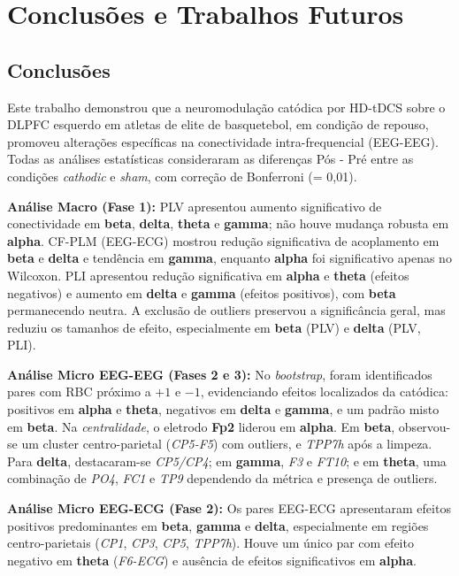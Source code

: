 \chapter{Conclusões e Trabalhos Futuros}
\label{chap:conclusoes_e_trabalhos_futuros}

\section{Conclusões}
Este trabalho demonstrou que a neuromodulação catódica por HD-tDCS sobre o DLPFC esquerdo em atletas de elite de basquetebol, em condição de repouso, promoveu alterações específicas na conectividade intra-frequencial (EEG-EEG). Todas as análises estatísticas consideraram as diferenças Pós - Pré entre as condições \emph{cathodic} e \textit{sham}, com correção de Bonferroni (\alpha= 0,01).

\noindent\textbf{Análise Macro (Fase 1):} PLV apresentou aumento significativo de conectividade em \textbf{beta}, \textbf{delta}, \textbf{theta} e \textbf{gamma}; não houve mudança robusta em \textbf{alpha}. CF-PLM (EEG-ECG) mostrou redução significativa de acoplamento em \textbf{beta} e \textbf{delta} e tendência em \textbf{gamma}, enquanto \textbf{alpha} foi significativo apenas no Wilcoxon. PLI apresentou redução significativa em \textbf{alpha} e \textbf{theta} (efeitos negativos) e aumento em \textbf{delta} e \textbf{gamma} (efeitos positivos), com \textbf{beta} permanecendo neutra. A exclusão de outliers preservou a significância geral, mas reduziu os tamanhos de efeito, especialmente em \textbf{beta} (PLV) e \textbf{delta} (PLV, PLI).

\noindent\textbf{Análise Micro EEG-EEG (Fases 2 e 3):} No \textit{bootstrap}, foram identificados pares com RBC próximo a $+1$ e $-1$, evidenciando efeitos localizados da catódica: positivos em \textbf{alpha} e \textbf{theta}, negativos em \textbf{delta} e \textbf{gamma}, e um padrão misto em \textbf{beta}. Na \textit{centralidade}, o eletrodo \textbf{Fp2} liderou em \textbf{alpha}. Em \textbf{beta}, observou-se um cluster centro-parietal (\textit{CP5-F5}) com outliers, e \textit{TPP7h} após a limpeza. Para \textbf{delta}, destacaram-se \textit{CP5/CP4}; em \textbf{gamma}, \textit{F3} e \textit{FT10}; e em \textbf{theta}, uma combinação de \textit{PO4}, \textit{FC1} e \textit{TP9} dependendo da métrica e presença de outliers.

\noindent\textbf{Análise Micro EEG-ECG (Fase 2):} Os pares EEG-ECG apresentaram efeitos positivos predominantes em \textbf{beta}, \textbf{gamma} e \textbf{delta}, especialmente em regiões centro-parietais (\textit{CP1}, \textit{CP3}, \textit{CP5}, \textit{TPP7h}). Houve um único par com efeito negativo em \textbf{theta} (\textit{F6-ECG}) e ausência de efeitos significativos em \textbf{alpha}.

